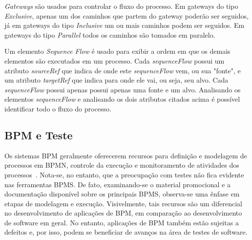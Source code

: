 \documentclass[12pt]{article}
\begin{document}
\emph{Gateways} são usados para controlar o fluxo do processo. Em gateways do tipo \emph{Exclusive}, apenas um dos caminhos que partem do gateway poderão ser seguidos, já em gateways do tipo \emph{Inclusive} um ou mais caminhos podem ser seguidos. Em gateways do tipo \emph{Parallel} todos os caminhos são tomados em paralelo.


Um elemento \emph{Sequence Flow} é usado para exibir a ordem em que os demais elementos são executados em um processo. Cada \emph{sequenceFlow} possui um atributo \emph{sourceRef} que indica de onde este \emph{sequenceFlow} vem, ou sua "fonte", e um atributo \emph{targetRef} que indica para onde ele vai, ou seja, seu alvo. Cada \emph{sequenceFlow} possui apenas possui apenas uma fonte e um alvo. Analisando os elementos \emph{sequenceFlow} e analisando os dois atributos citados acima é possível identificar todo o fluxo do processo.

\subsection{BPM e Teste}

Os sistemas BPM geralmente oferecerem recursos para definição e modelagem de processos em BPMN, controle da execução e monitoramento de atividades dos processos~\cite{forrester}. Nota-se, no entanto, que a preocupação com testes não fica evidente nas ferramentas BPMS. De fato, examinando-se o material promocional e a documentação disponível sobre os principais BPMS, observa-se uma ênfase em etapas de modelagem e execução. Visivelmente, tais recursos são um diferencial no desenvolvimento de aplicações de BPM, em comparação ao desenvolvimento de software em geral. No entanto, aplicações de BPM também estão sujeitas a defeitos e, por isso, podem se beneficiar de avanços na área de testes de software.

\end{document}
